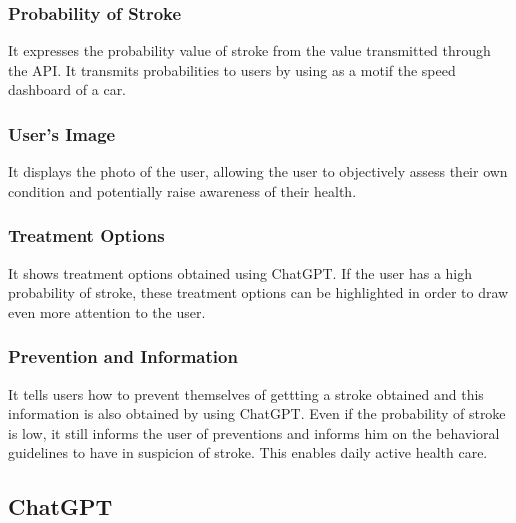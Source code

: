 \subsubsection{\textbf{Probability of Stroke}}
It expresses the probability value of stroke from the value transmitted through the API. It transmits probabilities to users by using as a motif the speed dashboard of a car.\\
\subsubsection{\textbf{User's Image}}
It displays the photo of the user, allowing the user to objectively assess their own condition and potentially raise awareness of their health.\\
\subsubsection{\textbf{Treatment Options}}
It shows treatment options obtained using ChatGPT. If the user has a high probability of stroke, these treatment options can be highlighted in order to draw even more attention to the user.\\
\subsubsection{\textbf{Prevention and Information}}
It tells users how to prevent themselves of gettting a stroke obtained and this information is also obtained by using ChatGPT. Even if the probability of stroke is low, it still informs the user of preventions and informs him on the behavioral guidelines to have in suspicion of stroke. This enables daily active health care.\\

\subsection{\textbf{ChatGPT}}

